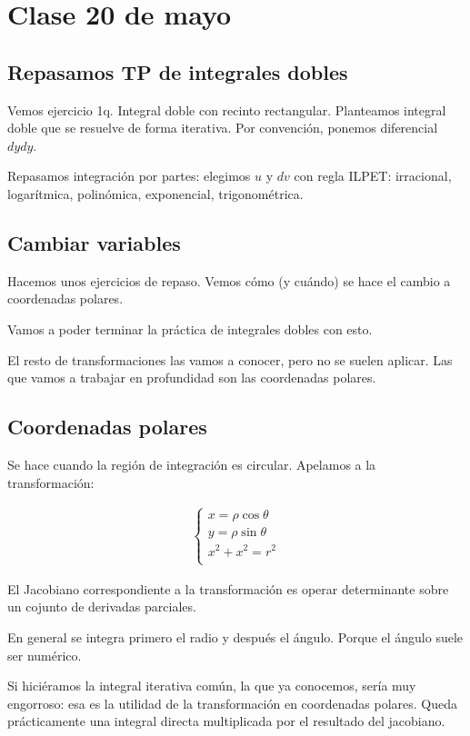 \section{Clase 20 de mayo}

\subsection{Repasamos TP de integrales dobles}

Vemos ejercicio 1q.
Integral doble con recinto rectangular.
Planteamos integral doble que se resuelve de forma iterativa.
Por convención, ponemos diferencial \(dy dy\).

Repasamos integración por partes:
elegimos \(u\) y \(dv\) con regla ILPET:
irracional, logarítmica, polinómica, exponencial, trigonométrica.

\subsection{Cambiar variables}

Hacemos unos ejercicios de repaso.
Vemos cómo (y cuándo) se hace el cambio a coordenadas polares.

Vamos a poder terminar la práctica de integrales dobles con esto.

El resto de transformaciones las vamos a conocer,
pero no se suelen aplicar.
Las que vamos a trabajar en profundidad son las coordenadas polares.

\subsection{Coordenadas polares}

Se hace cuando la región de integración es circular.
Apelamos a la transformación:

\begin{align*}
    \begin{cases}
        x = \rho\cos\theta    \\
        y = \rho\sin\theta    \\
        x^{2} + x^{2} = r^{2} \\
    \end{cases}
\end{align*}

El Jacobiano correspondiente a la transformación es operar determinante sobre un cojunto de derivadas parciales.

En general se integra primero el radio y después el ángulo.
Porque el ángulo suele ser numérico.

Si hiciéramos la integral iterativa común,
la que ya conocemos,
sería muy engorroso:
esa es la utilidad de la transformación en coordenadas polares.
Queda prácticamente una integral directa multiplicada por el resultado del jacobiano.